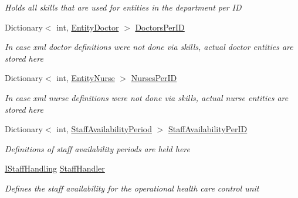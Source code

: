 \begin{DoxyCompactItemize}
\begin{DoxyCompactList}\small\item\em Holds all skills that are used for entities in the department per ID \end{DoxyCompactList}\item 
Dictionary$<$ int, \hyperlink{class_general_health_care_elements_1_1_entities_1_1_entity_doctor}{Entity\+Doctor} $>$ \hyperlink{class_general_health_care_elements_1_1_input_1_1_generic_x_m_l_department_input_a78bc2348758677c21ac342ccb2f5028c}{Doctors\+Per\+ID}
\begin{DoxyCompactList}\small\item\em In case xml doctor definitions were not done via skills, actual doctor entities are stored here \end{DoxyCompactList}\item 
Dictionary$<$ int, \hyperlink{class_general_health_care_elements_1_1_entities_1_1_entity_nurse}{Entity\+Nurse} $>$ \hyperlink{class_general_health_care_elements_1_1_input_1_1_generic_x_m_l_department_input_a4b10a81a9fde94f3974bd648da5b739a}{Nurses\+Per\+ID}
\begin{DoxyCompactList}\small\item\em In case xml nurse definitions were not done via skills, actual nurse entities are stored here \end{DoxyCompactList}\item 
Dictionary$<$ int, \hyperlink{class_general_health_care_elements_1_1_staff_handling_1_1_staff_availability_period}{Staff\+Availability\+Period} $>$ \hyperlink{class_general_health_care_elements_1_1_input_1_1_generic_x_m_l_department_input_a06408031dd37dc97e6e6a521be722323}{Staff\+Availability\+Per\+ID}
\begin{DoxyCompactList}\small\item\em Definitions of staff availability periods are held here \end{DoxyCompactList}\item 
\hyperlink{interface_general_health_care_elements_1_1_staff_handling_1_1_i_staff_handling}{I\+Staff\+Handling} \hyperlink{class_general_health_care_elements_1_1_input_1_1_generic_x_m_l_department_input_a59c888320a795b9431d4726a7d0edcf8}{Staff\+Handler}
\begin{DoxyCompactList}\small\item\em Defines the staff availability for the operational health care control unit \end{DoxyCompactList}\end{DoxyCompactItemize}


